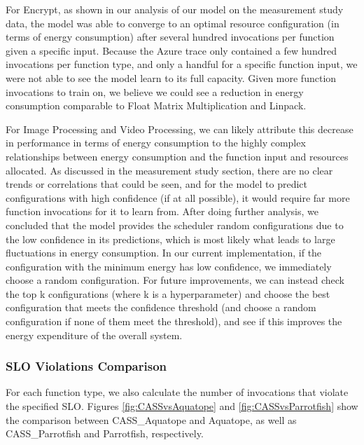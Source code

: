 \documentclass[times, 10pt,twocolumn]{article}
\begin{document}
For Encrypt, as shown in our analysis of our model on the measurement study data, the model was able to converge to an optimal resource configuration (in terms of energy consumption) after several hundred invocations per function given a specific input. Because the Azure trace only contained a few hundred invocations per function type, and only a handful for a specific function input, we were not able to see the model learn to its full capacity. Given more function invocations to train on, we believe we could see a reduction in energy consumption comparable to Float Matrix Multiplication and Linpack.

For Image Processing and Video Processing, we can likely attribute this decrease in performance in terms of energy consumption to the highly complex relationships between energy consumption and the function input and resources allocated. As discussed in the measurement study section, there are no clear trends or correlations that could be seen, and for the model to predict configurations with high confidence (if at all possible), it would require far more function invocations for it to learn from. After doing further analysis, we concluded that the model provides the scheduler random configurations due to the low confidence in its predictions, which is most likely what leads to large fluctuations in energy consumption. In our current implementation, if the configuration with the minimum energy has low confidence, we immediately choose a random configuration. For future improvements, we can instead check the top k configurations (where k is a hyperparameter) and choose the best configuration that meets the confidence threshold (and choose a random configuration if none of them meet the threshold), and see if this improves the energy expenditure of the overall system. 

\subsubsection{SLO Violations Comparison}

For each function type, we also calculate the number of invocations that violate the specified SLO. Figures \ref{fig:CASSvsAquatope} and \ref{fig:CASSvsParrotfish} show the comparison between CASS\_Aquatope and Aquatope, as well as CASS\_Parrotfish and Parrotfish, respectively. 
\end{document}
